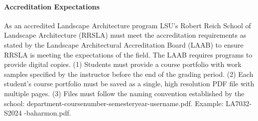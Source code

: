 \documentclass[11pt,article,oneside]{memoir}
\begin{document}
\paragraph{Accreditation Expectations}
As an accredited Landscape Architecture program
LSU's Robert Reich School of Landscape Architecture (RRSLA) 
must meet the accreditation requirements 
as stated by the Landscape Architectural Accreditation
Board (LAAB) to ensure RRSLA is meeting the expectations of the field. 
The LAAB requires programs to provide digital copies.
(1) Students must provide a course portfolio
with work samples specified by the instructor 
before the end of the grading period. 
(2) Each student's course portfolio must be saved as 
a single, high resolution PDF file with multiple pages. 
(3) Files must follow the naming convention
established by the school: department-coursenumber-semesteryear-username.pdf.
Example: LA7032-S2024 -baharmon.pdf.
\end{document}
